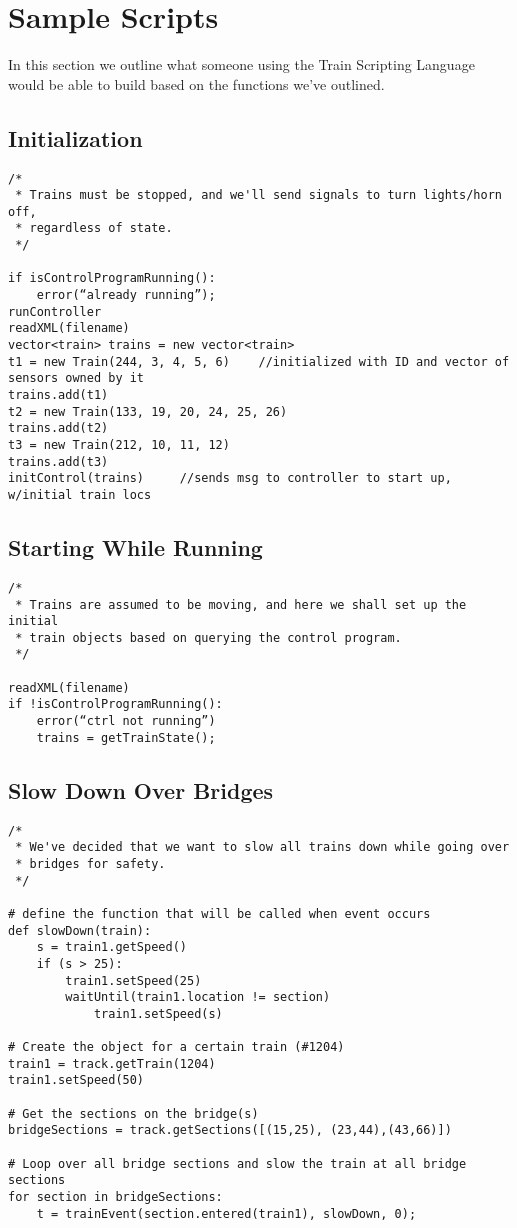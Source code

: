 \documentclass[a4paper,11pt,notitlepage]{article}
\def\TSL{Train Scripting Language\xspace}
\begin{document}
\newpage
\section{Sample Scripts}
In this section we outline what someone using the \TSL would be able to build based on the functions we've outlined.

\subsection{Initialization}
\begin{verbatim}
/*
 * Trains must be stopped, and we'll send signals to turn lights/horn off,
 * regardless of state.
 */

if isControlProgramRunning():
    error(“already running”);
runController
readXML(filename)
vector<train> trains = new vector<train>
t1 = new Train(244, 3, 4, 5, 6)    //initialized with ID and vector of sensors owned by it
trains.add(t1)
t2 = new Train(133, 19, 20, 24, 25, 26)
trains.add(t2)
t3 = new Train(212, 10, 11, 12)
trains.add(t3)
initControl(trains)     //sends msg to controller to start up, w/initial train locs
\end{verbatim}

\subsection{Starting While Running}
\begin{verbatim}
/*
 * Trains are assumed to be moving, and here we shall set up the initial
 * train objects based on querying the control program.
 */

readXML(filename)
if !isControlProgramRunning():
    error(“ctrl not running”)
	trains = getTrainState();
\end{verbatim}

\subsection{Slow Down Over Bridges}
\begin{verbatim}
/*
 * We've decided that we want to slow all trains down while going over
 * bridges for safety.
 */

# define the function that will be called when event occurs
def slowDown(train):
    s = train1.getSpeed()
	if (s > 25):
		train1.setSpeed(25)
		waitUntil(train1.location != section)
		    train1.setSpeed(s)

# Create the object for a certain train (#1204)
train1 = track.getTrain(1204)
train1.setSpeed(50)

# Get the sections on the bridge(s)
bridgeSections = track.getSections([(15,25), (23,44),(43,66)])

# Loop over all bridge sections and slow the train at all bridge sections
for section in bridgeSections:
    t = trainEvent(section.entered(train1), slowDown, 0);

\end{verbatim}
\end{document}
